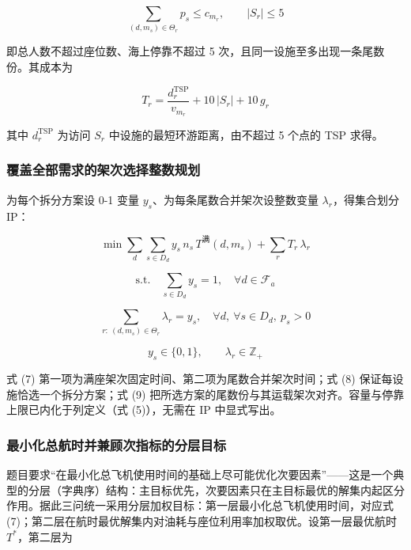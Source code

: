 \documentclass[UTF8,zihao=-4]{ctexart}
\numberwithin{figure}{section}
\numberwithin{table}{section}
\begin{document}
\begin{equation}
  \sum_{(d,m_s)\in\Theta_r} p_s \le c_{m_r},\qquad |S_r|\le 5
\end{equation}

即总人数不超过座位数、海上停靠不超过 5 次，且同一设施至多出现一条尾数份。其成本为

\begin{equation}
  T_r=\frac{d_r^{\mathrm{TSP}}}{v_{m_r}}+10\,|S_r|+10\,g_r
\end{equation}

其中 $d_r^{\mathrm{TSP}}$ 为访问 $S_r$ 中设施的最短环游距离，由不超过 5 个点的 TSP 求得。

\subsubsection{覆盖全部需求的架次选择整数规划}

为每个拆分方案设 0-1 变量 $y_s$、为每条尾数合并架次设整数变量 $\lambda_r$，得集合划分 IP：

\begin{equation}
  \min \sum_{d}\sum_{s\in D_d} y_s\,n_s\,T^{\text{满}}(d,m_s)+\sum_{r}T_r\,\lambda_r
\end{equation}

\begin{equation}
  \text{s.t.}\quad \sum_{s\in D_d} y_s=1,\quad \forall d\in\mathcal{F}_a
\end{equation}

\begin{equation}
  \sum_{r:\ (d,m_s)\in\Theta_r}\lambda_r = y_s,\quad \forall d,\ \forall s\in D_d,\ p_s>0
\end{equation}

\begin{equation}
  y_s\in\{0,1\},\qquad \lambda_r\in\mathbb{Z}_+
\end{equation}

式 (7) 第一项为满座架次固定时间、第二项为尾数合并架次时间；式 (8) 保证每设施恰选一个拆分方案；式 (9) 把所选方案的尾数份与其运载架次对齐。容量与停靠上限已内化于列定义（式 (5)），无需在 IP 中显式写出。

\subsubsection{最小化总航时并兼顾次指标的分层目标}

题目要求“在最小化总飞机使用时间的基础上尽可能优化次要因素”——这是一个典型的分层（字典序）结构：主目标优先，次要因素只在主目标最优的解集内起区分作用。据此三问统一采用分层加权目标：第一层最小化总飞机使用时间，对应式 (7)；第二层在航时最优解集内对油耗与座位利用率加权取优。设第一层最优航时 $T^*$，第二层为
\end{document}
